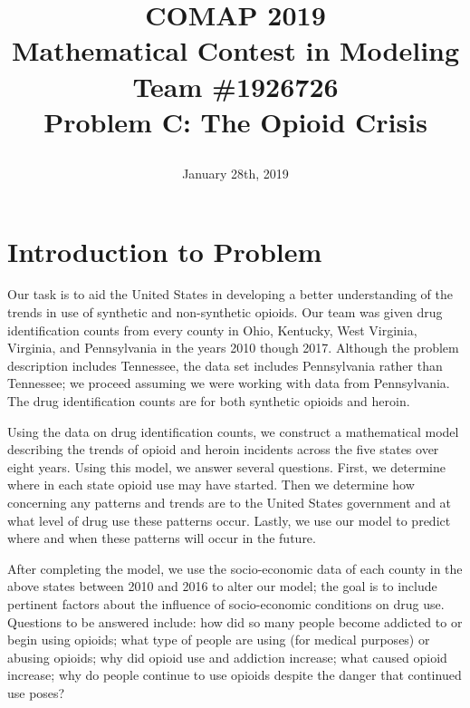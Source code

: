 \documentclass[12pt, letterpaper]{article}
\begin{document}
\title{
	\Huge{\bf{COMAP 2019}}\\
	\Huge{Mathematical Contest in Modeling}\\
	\bigskip 
	\bigskip
	\huge{Team \#1926726}\\
	\LARGE{Problem C: The Opioid Crisis}
	\date{January 28th, 2019}
}
\maketitle
\thispagestyle{empty}
\newpage

\tableofcontents
\newpage


\section{Introduction to Problem}
Our task is to aid the United States in developing a better understanding of the trends in use of synthetic and non-synthetic opioids. Our team was given drug identification counts from every county in Ohio, Kentucky, West Virginia, Virginia, and Pennsylvania in the years 2010 though 2017. Although the problem description includes Tennessee, the data set includes Pennsylvania rather than Tennessee; we proceed assuming we were working with data from Pennsylvania. The drug identification counts are for both synthetic opioids and heroin.

Using the data on drug identification counts, we construct a mathematical model describing the trends of opioid and heroin incidents across the five states over eight years. Using this model, we answer several questions. First, we determine where in each state opioid use may have started. Then we determine how concerning any patterns and trends are to the United States government and at what level of drug use these patterns occur. Lastly, we use our model to predict where and when these patterns will occur in the future.


After completing the model, we use the socio-economic data of each county in the above states between 2010 and 2016 to alter our model; the goal is to include pertinent factors about the influence of socio-economic conditions on drug use. Questions to be answered include: how did so many people become addicted to or begin using opioids; what type of people are using (for medical purposes) or abusing opioids; why did opioid use and addiction increase; what caused opioid increase; why do people continue to use opioids despite the danger that continued use poses?
\end{document}
